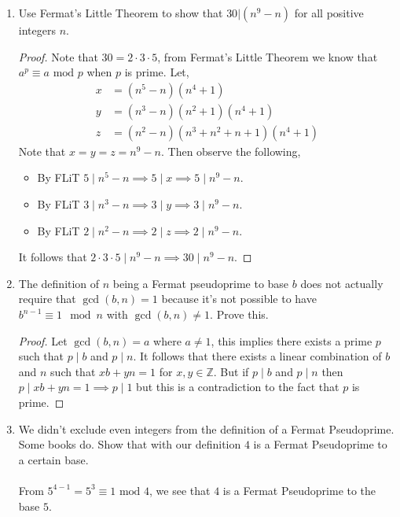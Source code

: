 \documentclass[class=article, crop=false]{standalone}
\def\integers{{\mathbb Z}}
\begin{document}
\begin{enumerate}
\item
  Use Fermat's Little Theorem
  to show that
  $30\big|(n^9-n)$
  for all positive integers $n$.
  \begin{proof}
	Note that $30 = 2\cdot 3\cdot 5$, from Fermat's Little Theorem we know that
	$a^p \equiv a\mbox{ mod }p$ when $p$ is prime.
	Let,
	\begin{align*}
	  x &= (n^5 -n)(n^4 +1) \\
	  y &= (n^3 -n)(n^2 +1)(n^4 +1) \\
	  z &= (n^2 -n)(n^3 +n^2 +n +1) (n^4 +1)
	\end{align*}
	Note that $x = y = z = n^9 -n$. Then observe the following,
	\begin{itemize}
	  \item By FLiT $5\mid n^5 - n \implies 5\mid x \implies 5\mid n^9 - n$.
	  \item By FLiT $3\mid n^3 - n \implies 3\mid y \implies 3\mid n^9 - n$.
	  \item By FLiT $2\mid n^2 - n \implies 2\mid z \implies 2\mid n^9 - n$.
	\end{itemize}
	It follows that $2\cdot 3\cdot 5 \mid n^9 -n \implies 30\mid n^9 -n$.
  \end{proof}

\item
  The definition of $n$ being a Fermat pseudoprime to base $b$
  does not actually require that $\gcd(b,n)=1$
  because it's not possible to have $b^{n-1}\equiv 1\mod n$ with $\gcd(b,n)\neq 1$.
  Prove this.
  \begin{proof}
	Let $\gcd(b,n)=a$ where $a\neq 1$, this implies there exists a prime $p$ such that
	$p\mid b$ and $p\mid n$. It follows that there exists a linear combination of $b$ and $n$
	such that $xb + yn = 1$ for $x,y\in\integers$. But if $p\mid b$ and $p\mid n$ then 
	$p\mid xb+yn = 1 \implies p\mid 1$ but this is a contradiction to the fact that $p$ is prime.
  \end{proof}

\item
  We didn't exclude even integers from the definition of a Fermat Pseudoprime.
  Some books do.
  Show that with our definition
  $4$ is a Fermat Pseudoprime to a certain base. \\\\
  From $5^{4-1}= 5^3 \equiv 1\mbox{ mod }4$, we see that $4$ is a Fermat Pseudoprime to the base $5$.


\end{enumerate}
\end{document}
